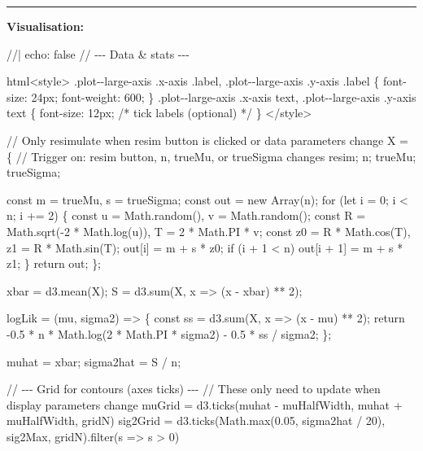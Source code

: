 \documentclass[
  letterpaper,
  DIV=11,
  numbers=noendperiod]{scrreprt}
\newenvironment{Shaded}{\begin{snugshade}}{\end{snugshade}}
\newcommand{\NormalTok}[1]{\textcolor[rgb]{0.00,0.23,0.31}{#1}}
\theoremstyle{definition}
\theoremstyle{plain}
\theoremstyle{definition}
\theoremstyle{remark}
\begin{document}
\begin{center}\rule{0.5\linewidth}{0.5pt}\end{center}

\textbf{Visualisation:}

\begin{Shaded}
\begin{Highlighting}[]
\NormalTok{//| echo: false}
\NormalTok{// {-}{-}{-} Data \& stats {-}{-}{-}}

\NormalTok{html\textasciigrave{}\textless{}style\textgreater{}}
\NormalTok{.plot{-}{-}large{-}axis .x{-}axis .label,}
\NormalTok{.plot{-}{-}large{-}axis .y{-}axis .label \{}
\NormalTok{font{-}size: 24px; font{-}weight: 600;}
\NormalTok{\}}
\NormalTok{.plot{-}{-}large{-}axis .x{-}axis text,}
\NormalTok{.plot{-}{-}large{-}axis .y{-}axis text \{}
\NormalTok{font{-}size: 12px; /* tick labels (optional) */}
\NormalTok{\}}
\NormalTok{\textless{}/style\textgreater{}\textasciigrave{}}

\NormalTok{// Only resimulate when resim button is clicked or data parameters change}
\NormalTok{X = \{}
\NormalTok{  // Trigger on: resim button, n, trueMu, or trueSigma changes}
\NormalTok{  resim; n; trueMu; trueSigma;}
  
\NormalTok{  const m = trueMu, s = trueSigma;}
\NormalTok{  const out = new Array(n);}
\NormalTok{  for (let i = 0; i \textless{} n; i += 2) \{}
\NormalTok{    const u = Math.random(), v = Math.random();}
\NormalTok{    const R = Math.sqrt({-}2 * Math.log(u)), T = 2 * Math.PI * v;}
\NormalTok{    const z0 = R * Math.cos(T), z1 = R * Math.sin(T);}
\NormalTok{    out[i] = m + s * z0;}
\NormalTok{    if (i + 1 \textless{} n) out[i + 1] = m + s * z1;}
\NormalTok{  \}}
\NormalTok{  return out;}
\NormalTok{\};}

\NormalTok{xbar = d3.mean(X);}
\NormalTok{S = d3.sum(X, x =\textgreater{} (x {-} xbar) ** 2);}

\NormalTok{logLik = (mu, sigma2) =\textgreater{} \{}
\NormalTok{  const ss = d3.sum(X, x =\textgreater{} (x {-} mu) ** 2);}
\NormalTok{  return {-}0.5 * n * Math.log(2 * Math.PI * sigma2) {-} 0.5 * ss / sigma2;}
\NormalTok{\};}

\NormalTok{muhat = xbar;}
\NormalTok{sigma2hat = S / n;}

\NormalTok{// {-}{-}{-} Grid for contours (axes ticks) {-}{-}{-}}
\NormalTok{// These only need to update when display parameters change}
\NormalTok{muGrid = d3.ticks(muhat {-} muHalfWidth, muhat + muHalfWidth, gridN)}
\NormalTok{sig2Grid = d3.ticks(Math.max(0.05, sigma2hat / 20), sig2Max, gridN).filter(s =\textgreater{} s \textgreater{} 0)}


\end{Highlighting}
\end{Shaded}
\end{document}
